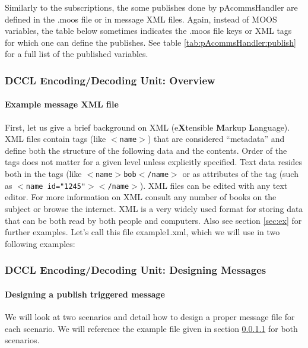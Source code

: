 \documentclass[11pt, letterpaper, oneside]{memoir}
\newcommand{\xmltag}[1]{\texttt{$<$#1$>$}}
\begin{document}
\begin{itemize}
Similarly to the subscriptions, the some publishes done by pAcommsHandler
are defined in the .moos file or in message XML files. Again, instead of MOOS variables,
the table below sometimes indicates the .moos file keys or XML tags for which one can define
the publishes. See table \ref{tab:pAcommsHandler:publish} for a full list of the published variables.

\subsubsection{DCCL Encoding/Decoding Unit: Overview} \label{sec:dccl_overview}

\paragraph{Example message XML file} \label{sec:ex_xml}

 First, let us give a brief background on XML (e\textbf{X}tensible \textbf{M}arkup
 \textbf{L}anguage). XML files contain tags (like
 \xmltag{name}) that are considered ``metadata'' and define both
 the structure of the following data and the contents. Order of the
 tags does not matter for a given level unless explicitly
 specified. Text data resides both in the tags (like
 \xmltag{name$>$bob$<$/name} or as attributes of the tag (such as
 \xmltag{name id="1245"$><$/name}). XML files can be edited with any
 text editor. For more information on XML consult any number of books
 on the subject or browse the internet. XML is a very widely used
 format for storing data that can be both read by both people and
 computers. Also see section \ref{sec:ex} for further examples. Let's call this file example1.xml, which we will use in two following examples:

\begin{small}

\end{small}

\subsubsection{DCCL Encoding/Decoding Unit: Designing Messages}

\paragraph{Designing a publish triggered message}  \label{sec:design}
We will look at two scenarios and detail how to design a proper message file for each scenario. We will reference the example file given in section \ref{sec:ex_xml} for both scenarios.


\end{itemize}
\end{document}
